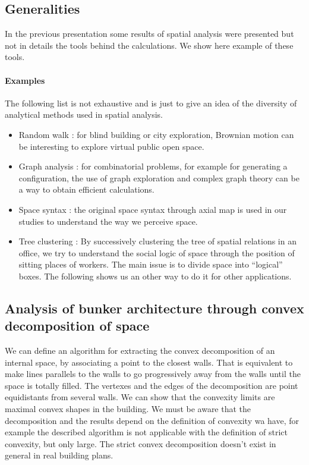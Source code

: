 \documentclass[english]{article}
\begin{document}
\subsection*{Generalities}

In the previous presentation some results of spatial analysis were
presented but not in details the tools behind the calculations. We
show here example of these tools.


\paragraph{Examples}

The following list is not exhaustive and is just to give an idea of
the diversity of analytical methods used in spatial analysis.
\begin{itemize}
\item Random walk : for blind building or city exploration, Brownian motion
can be interesting to explore virtual public open space.
\item Graph analysis : for combinatorial problems, for example for generating
a configuration, the use of graph exploration and complex graph theory
can be a way to obtain efficient calculations.
\item Space syntax : the original space syntax through axial map is used
in our studies to understand the way we perceive space.
\item Tree clustering : By successively clustering the tree of spatial relations
in an office, we try to understand the social logic of space through
the position of sitting places of workers. The main issue is to divide
space into ``logical'' boxes. The following shows us an other way
to do it for other applications.
\end{itemize}

\subsection*{Analysis of bunker architecture through convex decomposition of space}

We can define an algorithm for extracting the convex decomposition
of an internal space, by associating a point to the closest walls.
That is equivalent to make lines parallels to the walls to go progressively
away from the walls until the space is totally filled. The vertexes
and the edges of the decomposition are point equidistants from several
walls. We can show that the convexity limits are maximal convex shapes
in the building. We must be aware that the decomposition and the results
depend on the definition of convexity wa have, for example the described
algorithm is not applicable with the definition of strict convexity,
but only large. The strict convex decomposition doesn't exist in general
in real building plans.
\end{document}
